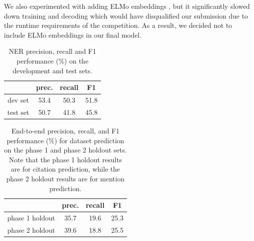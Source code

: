 \documentclass[11pt]{article}
\begin{document}
We also experimented with adding ELMo embeddings \cite{Peters2018DEEPCW}, but it significantly slowed down training and decoding which would have disqualified our submission due to the runtime requirements of the competition. As a result, we decided not to include ELMo embeddings in our final model.

\begin{table}[t]
\centering
\setlength{\tabcolsep}{2pt}
\begin{tabular}{@{}cccc@{}}
\toprule
                  & prec. & recall & F1 \\ \midrule
dev set           & 53.4    & 50.3 & 51.8 \\ 
test set          & 50.7    & 41.8 & 45.8 \\ \bottomrule
\end{tabular}
\caption{NER precision, recall and F1 performance (\%) on the development and test sets.}
\label{tab:ner_results}
\end{table}

\begin{table}[t]
\centering
\setlength{\tabcolsep}{2pt}
\begin{tabular}{@{}cccc@{}}
\toprule
                  & prec. & recall & F1 \\ \midrule
phase 1 holdout   & 35.7  & 19.6 & 25.3 \\ 
phase 2 holdout   & 39.6  & 18.8 & 25.5 \\ \bottomrule
\end{tabular}
\caption{End-to-end precision, recall, and F1 performance (\%) for dataset prediction on the phase 1 and phase 2 holdout sets. Note that the phase 1 holdout results are for citation prediction, while the phase 2 holdout results are for mention prediction.}
\label{tab:test_results}
\end{table}
\end{document}
